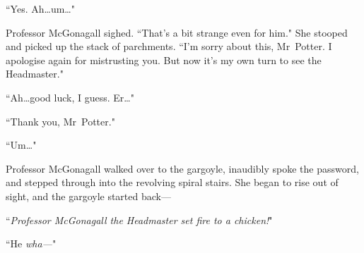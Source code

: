 ``Yes. Ah…um…"

Professor McGonagall sighed. ``That's a bit strange even for him." She stooped and picked up the stack of parchments. ``I'm sorry about this, Mr~Potter. I apologise again for mistrusting you. But now it's my own turn to see the Headmaster."

``Ah…good luck, I guess. Er…"

``Thank you, Mr~Potter."

``Um…"

Professor McGonagall walked over to the gargoyle, inaudibly spoke the password, and stepped through into the revolving spiral stairs. She began to rise out of sight, and the gargoyle started back—

``\emph{Professor McGonagall the Headmaster set fire to a chicken!}"

``He \emph{wha—}"

